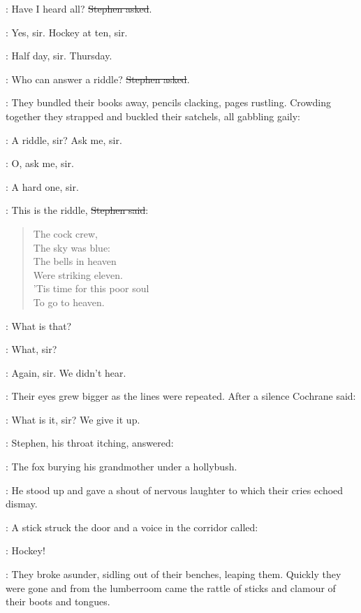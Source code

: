 \Stephen:
Have I heard all?
\sout{Stephen asked}.

\talbot:
Yes, sir. Hockey at ten, sir.

\armstrong:
Half day, sir.
Thursday.

\Stephen:
Who can answer a riddle?
\sout{Stephen asked}.

:
They bundled their books away, pencils clacking, pages rustling.
Crowding together they strapped and buckled their satchels, all gabbling gaily:

\comyn:
A riddle, sir?
Ask me, sir.

\armstrong:
O, ask me, sir.

\cochrane:
A hard one, sir.

\Stephen:
This is the riddle,
\sout{Stephen said}:

\begin{verse}
    The cock crew, \\
    The sky was blue: \\
    The bells in heaven \\
    Were striking eleven. \\
    'Tis time for this poor soul \\
    To go to heaven.
\end{verse}

\Stephen:
What is that?

\comyn:
What, sir?

\armstrong:
Again, sir.
We didn't hear.

:
Their eyes grew bigger as the lines were repeated.
After a silence Cochrane said:

\cochrane:
What is it, sir?
We give it up.

:
Stephen, his throat itching, answered:

\Stephen:
The fox burying his grandmother under a hollybush.

:
He stood up and gave a shout of nervous laughter
to which their cries echoed dismay.

:
A stick struck the door and a voice in the corridor called:

\deasy:
Hockey!

:
They broke asunder,
sidling out of their benches, leaping them.
Quickly they were gone
and from the lumberroom came the rattle of sticks
and clamour of their boots and tongues.

